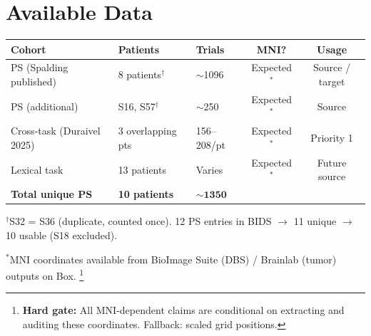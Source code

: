 \documentclass[11pt,letterpaper]{article}
\begin{document}
\section{Available Data}\label{sec:data}

\begin{table}[ht!]\centering\small
\begin{tabular}{@{}lllcc@{}}
\toprule
\textbf{Cohort} & \textbf{Patients} & \textbf{Trials} & \textbf{MNI?} & \textbf{Usage} \\
\midrule
PS (Spalding published) & 8 patients$^\dagger$ & ${\sim}$1096 & Expected$^*$ & Source / target \\
PS (additional) & S16, S57$^\dagger$ & ${\sim}$250 & Expected$^*$ & Source \\
Cross-task (Duraivel 2025) & 3 overlapping pts & 156--208/pt & Expected$^*$ & Priority 1 \\
Lexical task & 13 patients & Varies & Expected$^*$ & Future source \\
\midrule
\textbf{Total unique PS} & \textbf{10 patients} & $\mathbf{{\sim}1350}$ & & \\
\bottomrule
\end{tabular}
\end{table}

\noindent $^\dagger$S32 = S36 (duplicate, counted once). 12 PS entries in BIDS $\to$ 11 unique $\to$ 10 usable (S18 excluded).

\noindent $^*$MNI coordinates available from BioImage Suite (DBS) / Brainlab (tumor) outputs on Box.%
\footnote{\textbf{Hard gate:} All MNI-dependent claims are conditional on extracting and auditing these coordinates. Fallback: scaled grid positions.}
\end{document}
